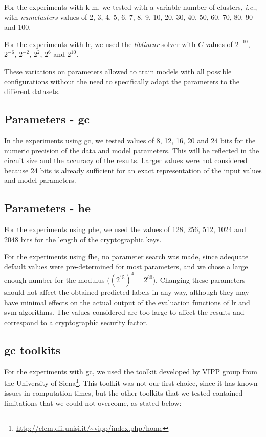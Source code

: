 For the experiments with \ac{k-m}, we tested with a variable number of clusters, \textit{i.e.}, with \textit{num\textunderscore clusters} values of 2, 3, 4, 5, 6, 7, 8, 9, 10, 20, 30, 40, 50, 60, 70, 80, 90 and 100.

For the experiments with \ac{lr}, we used the \textit{liblinear} solver with $C$ values of $2^{-10}$, $2^{-6}$, $2^{-2}$, $2^{2}$, $2^{6}$ and $2^{10}$.

 These variations on parameters allowed to train models with all possible configurations without the need to specifically adapt the parameters to the different datasets.



\subsection{Parameters - \acl{gc}}

In the experiments using \ac{gc}, we tested values of 8, 12, 16, 20 and 24 bits for the numeric precision of the data and model parameters. This will be reflected in the circuit size and the accuracy of the results. Larger values were not considered because 24 bits is already sufficient for an exact representation of the input values and model parameters.

\subsection{Parameters - \acl{he}}

For the experiments using \ac{phe}, we used the values of 128, 256, 512, 1024 and 2048 bits for the length of the cryptographic keys.

For the experiments using \ac{fhe}, no parameter search was made, since adequate default values were pre-determined for most parameters, and we chose a large enough number for the modulus ($(2^{15})^4=2^{60}$). Changing these parameters should not affect the obtained predicted labels in any way, although they may have minimal effects on the actual output of the evaluation functions of \ac{lr} and \ac{svm} algorithms. The values considered are too large to affect the results and correspond to a cryptographic security factor.



\subsection{\acl{gc} toolkits}


For the experiments with \ac{gc}, we used the toolkit developed by VIPP group from the University of Siena\footnote{\url{http://clem.dii.unisi.it/~vipp/index.php/home}}. This toolkit was not our first choice, since it has known issues in computation times, but the other toolkits that we tested contained limitations that we could not overcome, as stated below:

